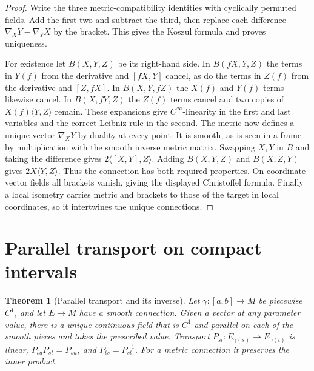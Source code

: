 \documentclass[11pt,oneside,openany]{book}
\theoremstyle{plain}
\newtheorem{theorem}{Theorem}[chapter]
\theoremstyle{definition}
\theoremstyle{remark}
\begin{document}
\begin{proof}
Write the three metric-compatibility identities with cyclically
permuted fields. Add the first two and subtract the third, then
replace each difference \(\nabla_XY-\nabla_YX\) by the bracket.
This gives the Koszul formula and proves uniqueness.

For existence let \(B(X,Y,Z)\) be its right-hand side.
In \(B(fX,Y,Z)\) the terms in \(Y(f)\) from the derivative
and \([fX,Y]\) cancel, as do the terms in \(Z(f)\) from
the derivative and \([Z,fX]\). In \(B(X,Y,fZ)\) the
\(X(f)\) and \(Y(f)\) terms likewise cancel. In \(B(X,fY,Z)\)
the \(Z(f)\) terms cancel and two copies of
\(X(f)\langle Y,Z\rangle\) remain. These expansions give
\(C^\infty\)-linearity in the first and last variables and
the correct Leibniz rule in the second. The metric now defines a
unique vector \(\nabla_XY\) by duality at every point. It is smooth,
as is seen in a frame by multiplication with the smooth inverse
metric matrix. Swapping \(X,Y\) in \(B\) and taking the difference
gives \(2\langle[X,Y],Z\rangle\). Adding \(B(X,Y,Z)\)
and \(B(X,Z,Y)\) gives \(2X\langle Y,Z\rangle\).
Thus the connection has both required properties.
On coordinate vector fields all brackets vanish, giving the
displayed Christoffel formula. Finally a local isometry carries
metric and brackets to those of the target in local coordinates,
so it intertwines the unique connections.
\end{proof}

\section{Parallel transport on compact intervals}\label{p202:G06}

\begin{theorem}[Parallel transport and its inverse]
\label{thm:p202-parallel}
Let \(\gamma:[a,b]\to M\) be piecewise \(C^1\), and let \(E\to M\)
have a smooth connection. Given a vector at any parameter value,
there is a unique continuous field that is \(C^1\) and parallel on
each of the smooth pieces and takes the prescribed value.
Transport \(P_{st}:E_{\gamma(s)}\to E_{\gamma(t)}\) is linear,
\(P_{tu}P_{st}=P_{su}\), and \(P_{ts}=P_{st}^{-1}\).
For a metric connection it preserves the inner product.
\end{theorem}
\end{document}
